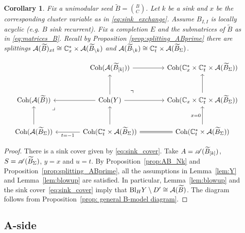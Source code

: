 \documentclass[12pt, letter]{amsart}
\newtheorem{corollary}[dummy]{Corollary}
\theoremstyle{definition}
\begin{document}
\begin{corollary}
    Fix a unimodular seed \( \widetilde B = \binom{B}{C}\). Let \(k\) be a sink and \(x\) be the corresponding cluster variable as in \eqref{eq:sink_exchange}. 
    Assume $B_{I,I}$ is locally acyclic (e.g. $B$ sink recurrent).
    Fix a completion \(E\) and the submatrices of $\widetilde{B}$ 
as in \eqref{eq:matrices_B}. Recall by Proposition \ref{prop:splitting_ABprime}  there are splittings \( \mathcal{A}(\widetilde{B})_{xt} \cong  \mathbb{C}^*_x \times \mathcal{A}(\widetilde B_{\setminus k}) \) and \(\mathcal{A}(\widetilde B_{\setminus k}) \cong \mathbb{C}^*_t \times \mathcal{A}(\widetilde B_\Sigma ) \). 

\begin{equation}\label{eq:s4-B-diagram}
\begin{tikzcd}[column sep=large,row sep=large]
&\Coh(\cA( \widetilde B_{[k]})) \arrow[r]
&\Coh( \bC_x^* \times  \bC^*_t \times \cA(\widetilde B_\Sigma ) )\\
\Coh(\mathcal{A}(\widetilde B)) \arrow[dr, phantom, "\lrcorner", very near start]
&\Coh(Y)\arrow[l]\arrow[u]\arrow[r] \arrow[ur, phantom, "\urcorner", very near start]
&\Coh(\bC_x \times  \bC^*_t \times \cA(\widetilde B_\Sigma )) \arrow[u]\\
\Coh( \cA(\widetilde B_{\Sigma}))  \arrow[u]
&\Coh(  \bC^*_t \times \cA(\widetilde B_\Sigma ))      \arrow[l,"t=-1"]
\arrow[u]\arrow[r,equal]
&\Coh(  \bC^*_t \times \cA(\widetilde B_\Sigma ) ) \arrow[u,"x=0"]
\end{tikzcd}
\end{equation}
\end{corollary}
\begin{proof}
There is a sink cover given by \eqref{eq:sink_cover}. 
Take \(A = \mathscr{A}( \widetilde B_{[k] })\), \(S = \mathscr{A} (\widetilde B_\Sigma )\), \(y = x\) and \(u = t\). 
By Proposition~\ref{prop:AB_Nk} and Proposition~\ref{prop:splitting_ABprime}, all the assumptions in Lemma~\ref{lem:Y} and Lemma~\ref{lem:blowup} are satisfied. In particular, Lemma~\ref{lem:blowup} and the sink cover~\eqref{eq:sink_cover} imply that \(\mathrm{Bl}_H Y \setminus D' \cong \mathcal{A}(\widetilde B)\). The diagram follows from Proposition~\ref{prop: general B-model diagram}. 
\end{proof}


\subsection{A-side}
\end{document}
